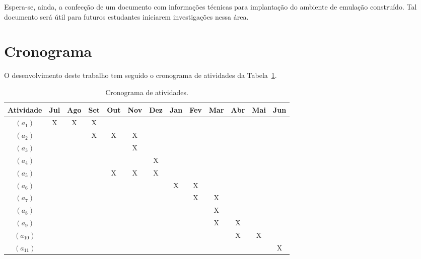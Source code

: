 \documentclass[	12pt, Times, openright, twoside, a4paper, english, brazil]{abntex2}
\begin{document}

Espera-se, ainda, a confecção de um documento com informações técnicas para implantação do ambiente de emulação construído. Tal documento será útil para futuros estudantes iniciarem investigações nessa área.


\section{Cronograma}


O desenvolvimento deste trabalho tem seguido o cronograma de atividades da Tabela~\ref{tabela:cronograma}.


\begin{table}[!ht]
\caption{Cronograma de atividades.} 
\label{tabela:cronograma}
\begin{center}
\begin{tabular}{|c|c|c|c|c|c|c|c|c|c|c|c|c|}
\hline
{\textbf{Atividade}} & Jul & Ago & Set & Out & Nov & Dez & Jan & Fev & Mar & Abr & Mai & Jun \\
\hline
$(a_1)$              & X   & X   &  X  &     &     &     &     &     &     &     &     &\\
\hline
$(a_2)$              &     &     &  X  &  X  &  X  &     &     &     &     &     &     &\\
\hline
$(a_3)$              &     &     &     &     &  X  &     &     &     &     &     &     &\\
\hline
$(a_4)$              &     &     &     &     &     &  X  &     &     &     &     &     &\\
\hline
$(a_5)$              &     &     &     &  X  &  X  &  X  &     &     &     &     &     &\\
\hline
$(a_6)$              &     &     &     &     &     &     &  X  &  X  &     &     &     &\\
\hline
$(a_7)$              &     &     &     &     &     &     &     &  X  &  X  &     &     &\\
\hline
$(a_8)$              &     &     &     &     &     &     &     &     &  X  &     &     &\\
\hline
$(a_9)$              &     &     &     &     &     &     &     &     &  X  &  X  &     &\\
\hline
$(a_{10})$             &     &     &     &     &     &     &     &     &     &  X  &  X  &\\
\hline
$(a_{11})$             &     &     &     &     &     &     &     &     &     &     &     &  X \\
\hline
\end{tabular}
\end{center}
\end{table}
\end{document}
